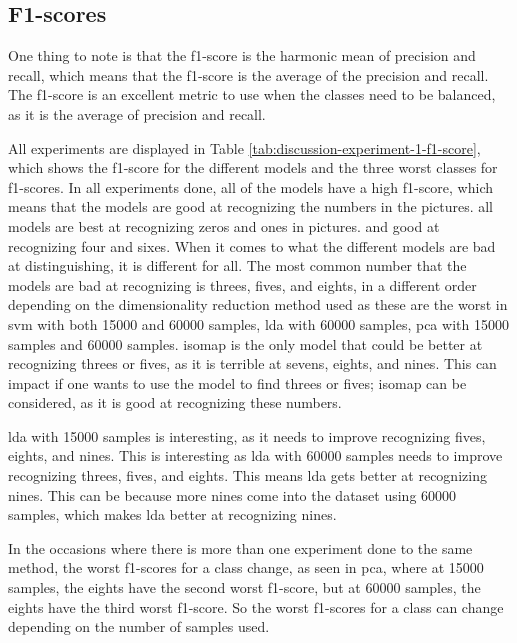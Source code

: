 \subsection{F1-scores}\label{subsec:discussion-experiment-1-f1-score}
One thing to note is that the f1-score is the harmonic mean of precision and recall, which means that the f1-score is the average of the precision and recall. The f1-score is an excellent metric to use when the classes need to be balanced, as it is the average of precision and recall.

All experiments are displayed in Table \ref{tab:discussion-experiment-1-f1-score}, which shows the f1-score for the different models and the three worst classes for f1-scores.
In all experiments done, all of the models have a high f1-score, which means that the models are good at recognizing the numbers in the pictures. all models are best at recognizing zeros and ones in pictures. and good at recognizing four and sixes. When it comes to what the different models are bad at distinguishing, it is different for all. The most common number that the models are bad at recognizing is threes, fives, and eights, in a different order depending on the dimensionality reduction method used as these are the worst in \gls{svm} with both 15000 and 60000 samples, \gls{lda} with 60000 samples, \gls{pca} with 15000 samples and 60000 samples. \gls{isomap} is the only model that could be better at recognizing threes or fives, as it is terrible at sevens, eights, and nines. This can impact if one wants to use the model to find threes or fives; \gls{isomap} can be considered, as it is good at recognizing these numbers.

\gls{lda} with 15000 samples is interesting, as it needs to improve recognizing fives, eights, and nines. This is interesting as \gls{lda} with 60000 samples needs to improve recognizing threes, fives, and eights. This means \gls{lda} gets better at recognizing nines. This can be because more nines come into the dataset using 60000 samples, which makes \gls{lda} better at recognizing nines. 

In the occasions where there is more than one experiment done to the same method, the worst f1-scores for a class change, as seen in \gls{pca}, where at 15000 samples, the eights have the second worst f1-score, but at 60000 samples, the eights have the third worst f1-score. So the worst f1-scores for a class can change depending on the number of samples used.


